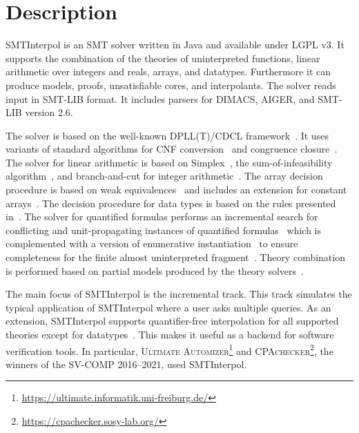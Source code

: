\documentclass[a4paper]{easychair}
\title{\SI with resolution proofs\\{\large Version \version}}
\author{Jochen Hoenicke \and Tanja Schindler}
\institute{
  University of Freiburg\\
  \email{\{hoenicke,schindle\}@informatik.uni-freiburg.de}\\[1ex]
  \today
}
\newcommand\SI{SMTInterpol\xspace}
\begin{document}
\maketitle
\section*{Description}
\SI is an SMT solver written in Java and available under LGPL v3.
It supports the combination of the theories of uninterpreted functions, linear arithmetic over integers and reals, arrays, and datatypes.
Furthermore it can produce models, proofs, unsatisfiable cores, and interpolants.
The solver reads input in SMT-LIB format.
It includes parsers for DIMACS, AIGER, and SMT-LIB version 2.6.

The solver is based on the well-known DPLL(T)/CDCL framework~\cite{DBLP:conf/cav/GanzingerHNOT04}.
It uses variants of standard algorithms for CNF conversion~\cite{DBLP:journals/jsc/PlaistedG86} and congruence closure~\cite{DBLP:conf/rta/NieuwenhuisO05}.
The solver for linear arithmetic is based on Simplex~\cite{DBLP:conf/cav/DutertreM06}, the sum-of-infeasibility algorithm~\cite{DBLP:conf/fmcad/KingBD13}, and branch-and-cut for integer arithmetic~\cite{DBLP:conf/cav/ChristH15,DBLP:conf/cav/DilligDA09}.
The array decision procedure is based on weak equivalences~\cite{DBLP:conf/frocos/ChristH15} and includes an extension for constant arrays~\cite{DBLP:conf/vmcai/HoenickeS19}.
The decision procedure for data types is based on the rules presented in~\cite{DBLP:journals/jsat/BarrettST07}.
The solver for quantified formulas performs an incremental search for conflicting and unit-propagating instances of quantified formulas~\cite{DBLP:conf/vmcai/HoenickeS21} which is complemented with a version of enumerative instantiation~\cite{DBLP:conf/tacas/ReynoldsBF18} to ensure completeness for the finite almost uninterpreted fragment~\cite{DBLP:conf/cav/GeM09}.
Theory combination is performed based on partial models produced by the theory solvers~\cite{DBLP:journals/entcs/MouraB08}.

The main focus of \SI is the incremental track.
This track simulates the typical application of \SI where a user asks multiple queries.
As an extension, \SI supports quantifier-free interpolation for all supported theories except for datatypes~\cite{DBLP:journals/jar/ChristH16,DBLP:conf/cade/HoenickeS18,DBLP:conf/vmcai/HoenickeS19}.
This makes it useful as a backend for software verification tools.
In particular, \textsc{Ultimate Automizer}\footnote{\url{https://ultimate.informatik.uni-freiburg.de/}} and \textsc{CPAchecker}\footnote{\url{https://cpachecker.sosy-lab.org/}}, the winners of the SV-COMP 2016--2021, used \SI.
\end{document}
